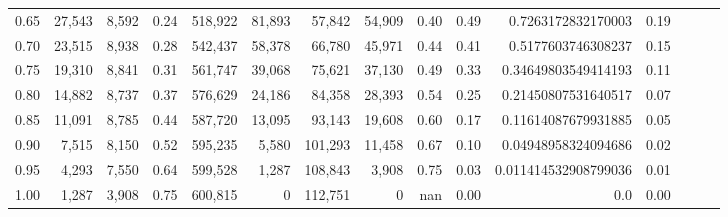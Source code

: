 \begin{tabular}{rrrrrrrrrrrrrrr}
0.65 &  27,543 &  8,592 &  0.24 &  518,922 &   81,893 &   57,842 &   54,909 &  0.40 &  0.49 &    0.7263172832170003 &      0.19 \\
0.70 &  23,515 &  8,938 &  0.28 &  542,437 &   58,378 &   66,780 &   45,971 &  0.44 &  0.41 &    0.5177603746308237 &      0.15 \\
0.75 &  19,310 &  8,841 &  0.31 &  561,747 &   39,068 &   75,621 &   37,130 &  0.49 &  0.33 &   0.34649803549414193 &      0.11 \\
0.80 &  14,882 &  8,737 &  0.37 &  576,629 &   24,186 &   84,358 &   28,393 &  0.54 &  0.25 &   0.21450807531640517 &      0.07 \\
0.85 &  11,091 &  8,785 &  0.44 &  587,720 &   13,095 &   93,143 &   19,608 &  0.60 &  0.17 &   0.11614087679931885 &      0.05 \\
0.90 &   7,515 &  8,150 &  0.52 &  595,235 &    5,580 &  101,293 &   11,458 &  0.67 &  0.10 &   0.04948958324094686 &      0.02 \\
0.95 &   4,293 &  7,550 &  0.64 &  599,528 &    1,287 &  108,843 &    3,908 &  0.75 &  0.03 &  0.011414532908799036 &      0.01 \\
1.00 &   1,287 &  3,908 &  0.75 &  600,815 &        0 &  112,751 &        0 &   nan &  0.00 &                   0.0 &      0.00 \\
\bottomrule
\end{tabular}
